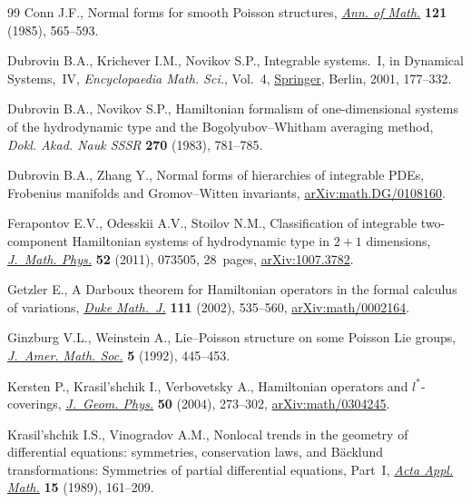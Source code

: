 \documentclass[pdftex]{sigma}
\numberwithin{equation}{section}
\begin{document}
\begin{thebibliography}{99}
Conn J.F., Normal forms for smooth {P}oisson structures, \href{https://doi.org/10.2307/1971210}{\textit{Ann. of Math.}}
 \textbf{121} (1985), 565--593.

Dubrovin B.A., Krichever I.M., Novikov S.P., Integrable systems.~{I}, in
 Dynamical {S}ystems,~{IV}, \textit{Encyclopaedia Math. Sci.}, Vol.~4,
 \href{https://doi.org/10.1007/978-3-662-06791-8_3}{Springer}, Berlin, 2001, 177--332.

Dubrovin B.A., Novikov S.P., Hamiltonian formalism of one-dimensional systems
 of the hydrodynamic type and the {B}ogolyubov--{W}hitham averaging method,
 \textit{Dokl. Akad. Nauk SSSR} \textbf{270} (1983), 781--785.

Dubrovin B.A., Zhang Y., Normal forms of hierarchies of integrable {PDE}s,
 {F}robenius manifolds and {G}romov--{W}itten invariants,
 \href{https://arxiv.org/abs/math.DG/0108160}{arXiv:math.DG/0108160}.

Ferapontov E.V., Odesskii A.V., Stoilov N.M., Classification of integrable
 two-component {H}amiltonian systems of hydrodynamic type in {$2+1$}
 dimensions, \href{https://doi.org/10.1063/1.3602081}{\textit{J.~Math. Phys.}} \textbf{52} (2011), 073505, 28~pages,
 \href{https://arxiv.org/abs/1007.3782}{arXiv:1007.3782}.

Getzler E., A {D}arboux theorem for {H}amiltonian operators in the formal
 calculus of variations, \href{https://doi.org/10.1215/S0012-7094-02-11136-3}{\textit{Duke Math.~J.}} \textbf{111} (2002), 535--560,
 \href{https://arxiv.org/abs/math/0002164}{arXiv:math/0002164}.

Ginzburg V.L., Weinstein A., Lie--{P}oisson structure on some {P}oisson {L}ie
 groups, \href{https://doi.org/10.2307/2152773}{\textit{J.~Amer. Math. Soc.}} \textbf{5} (1992), 445--453.

Kersten P., Krasil'shchik I., Verbovetsky A., Hamiltonian operators and
 {$l^*$}-coverings, \href{https://doi.org/10.1016/j.geomphys.2003.09.010}{\textit{J.~Geom. Phys.}} \textbf{50} (2004), 273--302,
 \href{https://arxiv.org/abs/math/0304245}{arXiv:math/0304245}.

Krasil'shchik I.S., Vinogradov A.M., Nonlocal trends in the geometry of
 differential equations: symmetries, conservation laws, and {B}\"acklund
 transformations: Symmetries of partial differential equations, Part~{I},
 \href{https://doi.org/10.1007/BF00131935}{\textit{Acta Appl. Math.}} \textbf{15} (1989), 161--209.


\end{thebibliography}
\end{document}
